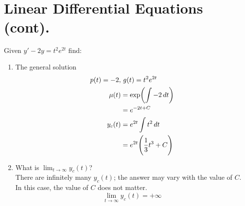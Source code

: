 \documentclass[twoside]{report}
\begin{document}
    \section{Linear Differential Equations (cont).}
    \begin{example}
        Given $y'-2y=t^{2}e^{2t}$ find:
        \begin{enumerate}
            \item The general solution
            \begin{align}
                p(t) = -2,&\ g(t) = t^{2}e^{2t}\\
                \mu(t) %
                &= \exp\bbbp{\int -2\,dt}\\
                &= e^{-2t+C}\\
                y_c(t) &= e^{2t}\int t^{2}\,dt\\
                &= e^{2t}\BBp{\frac{1}{3}t^{3} + C}
            \end{align}
            \item What is $\lim_{t \rightarrow \infty} y_c(t)$?\\
            There are infinitely many $y_c(t)$; the answer may vary with the value of $C$. In this case, the value of $C$ does not matter.
            $$\lim_{t \rightarrow \infty} y_{c}(t) = +\infty$$
        \end{enumerate}
    \end{example}
    \np
\end{document}
